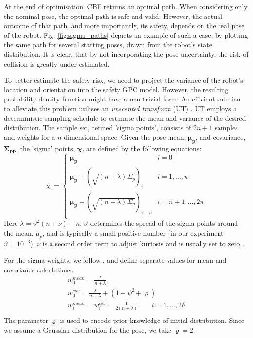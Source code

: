 \documentclass[shortAfour,sageh,times]{sagej_no_sage}
\begin{document}
At the end of optimisation, CBE returns an optimal path. When considering only the nominal pose, the optimal path is safe and valid. However, the actual outcome of that path, and more importantly, its safety, depends on the real pose of the robot. Fig. \ref{fig:sigma_paths} depicts an example of such a case, by plotting the same path for several starting poses, drawn from the robot's state distribution. It is clear, that by not incorporating the pose uncertainty, the risk of collision is greatly under-estimated. 

To better estimate the safety risk, we need to project the variance of the robot's location and orientation into the safety GPC model. However, the resulting probability density function might have a non-trivial form. An efficient solution to alleviate this problem utilises an \textit{unscented transform} (UT) \citep{Julier1997}. UT employs a deterministic sampling schedule to estimate the mean and variance of the desired distribution. The sample set, termed 'sigma points', consists of $2n+1$ samples and weights for a $n$-dimensional space. Given the pose mean, $\boldsymbol{\mu_p}$, and covariance, $\boldsymbol{\Sigma_{pp}}$, the 'sigma' points, $\boldsymbol{\chi}$, are defined by the following equations:
\begin{equation}\label{eq:sigma_point}
	\chi_i = 
	\begin{cases}
	\boldsymbol{\mu_p} & i=0\\
	\boldsymbol{\mu_p} + (\sqrt{(n+\lambda)\Sigma_{p}})_i & i=1,...,n\\
	\boldsymbol{\mu_p} - (\sqrt{(n+\lambda)\Sigma_{p}})_{i-n} & i=n+1,...,2n\\
	\end{cases}
\end{equation}
Here $\lambda = \vartheta^2(n+\nu)-n$. $\vartheta$ determines the spread of the sigma points around the mean, $\mu_p$, and is typically a small positive number (in our experiment $\vartheta = 10^{-3}$). $\nu$ is a second order term to adjust kurtosis and is usually set to zero \citep{Wan2000}.

For the sigma weights, we follow \citet{Wan2000}, and define separate values for mean and covariance calculations:
\begin{equation}\label{eq:sigma_w}
\begin{aligned}
& w^{mean}_0 = \frac{\lambda}{n+\lambda} &\\
& w^{cov}_0 = \frac{\lambda}{n+\lambda} + (1-\psi^2+\varrho) &\\
& w^{mean}_i = w^{cov}_i = \frac{1}{2(n+\lambda)} \qquad i=1,...,2\delta&\\
\end{aligned}
\end{equation}
The parameter $\varrho$ is used to encode prior knowledge of initial distribution. Since we assume a Gaussian distribution for the pose, we take $\varrho=2$. 
\end{document}
